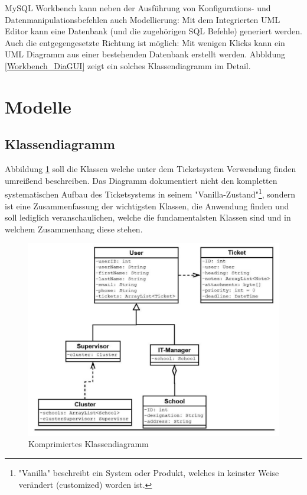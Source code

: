 	MySQL Workbench kann neben der Ausführung von Konfigurations- und Datenmanipulationsbefehlen auch Modellierung: Mit dem Integrierten UML Editor kann eine Datenbank (und die zugehörigen SQL Befehle) generiert werden. Auch die entgegengesetzte Richtung ist möglich: Mit wenigen Klicks kann ein UML Diagramm aus einer bestehenden Datenbank erstellt werden. Abbldung \ref{Workbench_DiaGUI} zeigt ein solches Klassendiagramm im Detail.
	
		
	\newpage
	\section{Modelle}
	\subsection{Klassendiagramm}
	Abbildung \ref{Klassendiagramm_System} soll die Klassen welche unter dem Ticketsystem Verwendung finden umreißend beschreiben. Das Diagramm dokumentiert nicht den kompletten systematischen Aufbau des Ticketsystems in seinem "Vanilla-Zustand"\footnote{"Vanilla" beschreibt ein System oder Produkt, welches in keinster Weise verändert (customized) worden ist.}, sondern ist eine Zusammenfassung der wichtigsten Klassen, die Anwendung finden und soll lediglich veranschaulichen, welche die fundamentalsten Klassen sind und in welchem Zusammenhang diese stehen.
	\begin{figure}[h]
		\centering
		\includegraphics[scale=0.9]{figures/Klassendiagramm.jpg}
		\caption{Komprimiertes Klassendiagramm}
		\label{Klassendiagramm_System}
	\end{figure}
	

